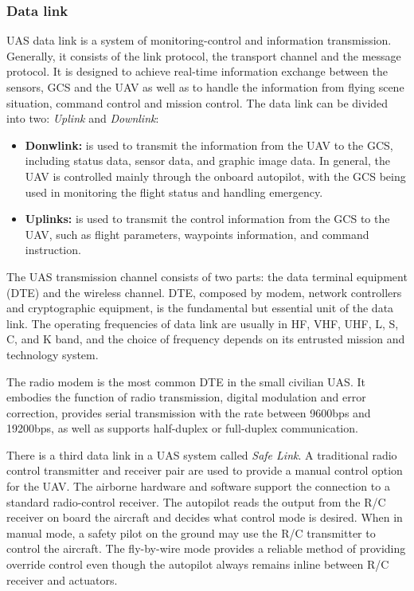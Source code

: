 \subsubsection{Data link}
UAS data link is a system of monitoring-control and information transmission. Generally, it consists of the link protocol, the transport channel and the message protocol. It is designed to achieve real-time information exchange between the sensors, GCS and the UAV as well as to handle the information from flying scene situation, command control and mission control.\cite{6305636} The data link can be divided into two: \textit{Uplink} and \textit{Downlink}:

\begin{itemize}
    \item \textbf{Donwlink:}  is used to transmit the information from the UAV to the GCS, including status data, sensor data, and graphic image data. In general, the UAV is controlled mainly through the onboard autopilot, with the GCS being used in monitoring the flight status and handling emergency. \cite{6305636}
    \item \textbf{Uplinks:} is used to transmit the control information from the GCS to the UAV, such as flight parameters, waypoints information, and command instruction. \cite{6305636}
\end{itemize}

The UAS transmission channel consists of two parts: the data terminal equipment (DTE) and the wireless channel. DTE, composed by modem, network controllers and cryptographic equipment, is the fundamental but essential unit of the data link. The operating frequencies of data link are usually in HF, VHF, UHF, L, S, C, and K band, and the choice of frequency depends on its entrusted mission and technology system.\cite{6305636}

The radio modem is the most common DTE in the small civilian UAS. It embodies the function of radio transmission, digital modulation and error correction, provides serial transmission with the rate between 9600bps and 19200bps, as well as supports half-duplex or full-duplex communication.\cite{6305636}

There is a third data link in a UAS system called \textit{Safe Link}. A traditional radio control transmitter and receiver pair are used to provide a manual control option for the UAV. The airborne hardware and software support the connection to a standard radio-control receiver. The autopilot reads the output from the R/C receiver on board the aircraft and decides what control mode is desired. When in manual mode, a safety pilot on the ground may use the R/C transmitter to control the aircraft. The fly-by-wire mode provides a reliable method of providing override control even though the autopilot always remains inline between R/C receiver and actuators.\cite{Hattenberger2014UsingTP}

